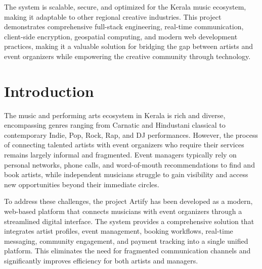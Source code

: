 \documentclass[12pt,a4paper]{report}
\newcounter{listcount}
\let\oldlistoffigures\listoffigures
\renewcommand{\listoffigures}{%
\begingroup
\setcounter{listcount}{0}%
\let\oldnumberline\numberline
\renewcommand\numberline[1]{\stepcounter{listcount}\oldnumberline{\arabic{listcount}}}%

\oldlistoffigures
\endgroup
}
\let\oldlistoftables\listoftables
\renewcommand{\listoftables}{%
\begingroup
\setcounter{listcount}{0}%
\let\oldnumberline\numberline
\renewcommand\numberline[1]{\stepcounter{listcount}\oldnumberline{\arabic{listcount}}}%
\oldlistoftables
\endgroup
}
\begin{document}
The system is scalable, secure, and optimized for the Kerala music ecosystem, making it adaptable to other regional creative industries. This project demonstrates comprehensive full-stack engineering, real-time communication, client-side encryption, geospatial computing, and modern web development practices, making it a valuable solution for bridging the gap between artists and event organizers while empowering the creative community through technology.

\pagestyle{empty}

\tableofcontents

\clearpage

\listoffigures

\clearpage

\listoftables

\clearpage

\newpage
{}
\pagestyle{maincontent}
\setcounter{chapter}{1}
\clearpage
\thispagestyle{empty}

\noindent
{}

\clearpage

\section{Introduction}
The music and performing arts ecosystem in Kerala is rich and diverse, encompassing genres ranging from Carnatic and Hindustani classical to contemporary Indie, Pop, Rock, Rap, and DJ performances. However, the process of connecting talented artists with event organizers who require their services remains largely informal and fragmented. Event managers typically rely on personal networks, phone calls, and word-of-mouth recommendations to find and book artists, while independent musicians struggle to gain visibility and access new opportunities beyond their immediate circles.

To address these challenges, the project Artify has been developed as a modern, web-based platform that connects musicians with event organizers through a streamlined digital interface. The system provides a comprehensive solution that integrates artist profiles, event management, booking workflows, real-time messaging, community engagement, and payment tracking into a single unified platform. This eliminates the need for fragmented communication channels and significantly improves efficiency for both artists and managers.
\end{document}
